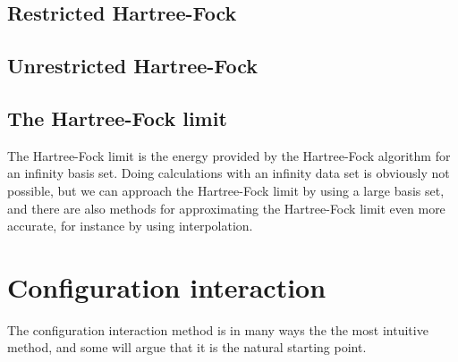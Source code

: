 \subsection{Restricted Hartree-Fock}

\subsection{Unrestricted Hartree-Fock}

\subsection{The Hartree-Fock limit}
The Hartree-Fock limit is the energy provided by the Hartree-Fock algorithm for an infinity basis set. Doing calculations with an infinity data set is obviously not possible, but we can approach the Hartree-Fock limit by using a large basis set, and there are also methods for approximating the Hartree-Fock limit even more accurate, for instance by using interpolation. 

\section{Configuration interaction} \label{sec:ci}
The configuration interaction method is in many ways the the most intuitive method, and some will argue that it is the natural starting point. 

